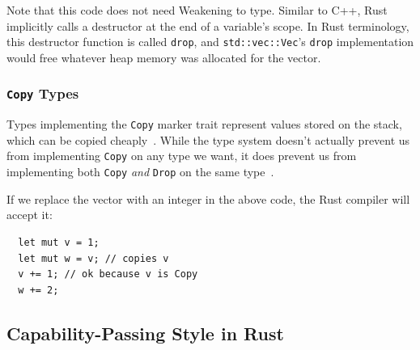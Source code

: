 \documentclass[sigplan,11pt,screen,nonacm]{acmart}
\newcommand*{\Copy}{\texttt{Copy}}
\begin{document}
Note that this code does not need Weakening to type. Similar to C++, Rust implicitly calls a destructor at the end of a variable's scope. In Rust terminology, this destructor function is called \texttt{drop}, and \texttt{std::vec::Vec}'s \texttt{drop} implementation would free whatever heap memory was allocated for the vector.

\subsubsection{\Copy{} Types}

Types implementing the \Copy{} marker trait represent values stored on the stack, which can be copied cheaply~\cite[Chapter 4.1]{rust:book}. While the type system doesn't actually prevent us from implementing \Copy{} on any type we want, it does prevent us from implementing both \Copy{} \emph{and} \texttt{Drop} on the same type~\cite{rust:ops-drop}.

If we replace the vector with an integer in the above code, the Rust compiler will accept it:
\begin{verbatim}
  let mut v = 1;
  let mut w = v; // copies v
  v += 1; // ok because v is Copy
  w += 2;
\end{verbatim}

\subsection{Capability-Passing Style in Rust} \label{sec:rust:capability-passing-style}
\end{document}
